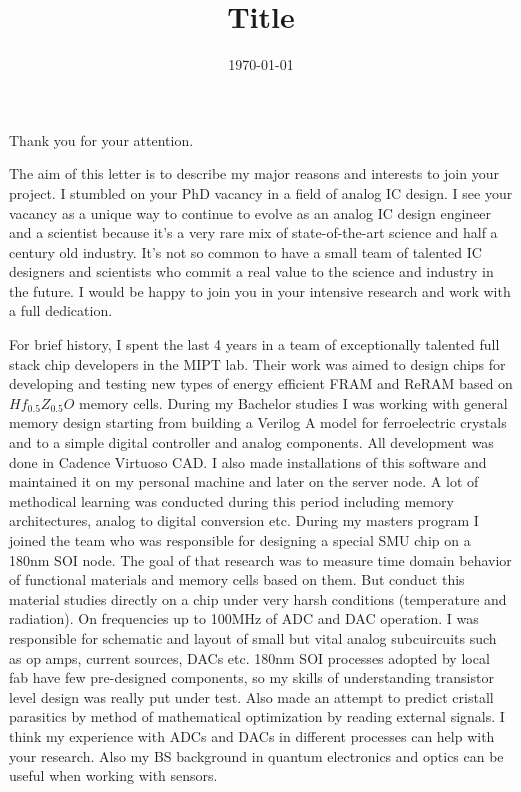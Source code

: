\documentclass[12pt,a4paper,roman]{moderncv}        %
\title{Title}                               %
\begin{document}
\date{\today}
\opening{}
\closing{Thank you for your attention.}
\makelettertitle

The aim of this letter is to describe my major reasons and interests to join your project. I stumbled on your PhD vacancy  in a field of analog IC design. I see your vacancy as a unique way to continue to evolve as an analog IC design  engineer and a scientist because it’s a very rare mix of state-of-the-art science and half a century old industry. It’s not so common to have a small team of talented IC designers and scientists who commit a real value to the science and industry in the future. I would be happy to join you in your intensive research and work with a full dedication.

For brief history, I spent the last 4 years in a team of exceptionally talented full stack chip developers in the MIPT lab. Their work was aimed to design chips for developing and testing new types of energy efficient FRAM and ReRAM based on $Hf_{0.5} Z_{0.5} O $ memory cells. During my Bachelor studies I was working with general memory design starting from building a Verilog A model for ferroelectric crystals and to a simple digital controller and analog components. All development was done in Cadence Virtuoso CAD. I also made installations of this software and maintained it on my personal machine and later on the server node. A lot of methodical learning was conducted during this period including memory architectures, analog to digital conversion etc.
During my masters program I joined the team who was responsible for designing a special SMU chip on a 180nm SOI node. The goal of that research was to measure time domain behavior  of functional materials and memory cells based on them. But conduct this material studies directly on a chip under very harsh conditions (temperature and radiation). On  frequencies  up to 100MHz of ADC and DAC operation. I was responsible for schematic and layout of  small but vital analog subcuircuits such as op amps, current sources, DACs etc. 180nm SOI  processes adopted by local fab have few pre-designed components, so my skills of understanding transistor level design was really put under test. Also made an attempt to predict cristall parasitics by method of mathematical optimization by reading external signals. I think my experience with ADCs and DACs in different  processes can help with your research. Also my BS background in quantum electronics and optics can be useful when working with sensors.
\end{document}
